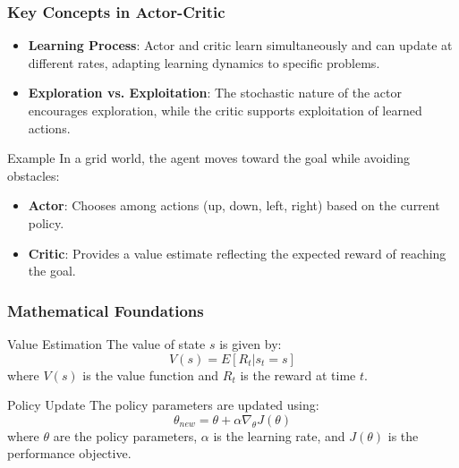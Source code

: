 \documentclass[aspectratio=169]{beamer}
\begin{document}
\begin{frame}[fragile]
    \frametitle{Key Concepts in Actor-Critic}
    \begin{itemize}
        \item \textbf{Learning Process}: Actor and critic learn simultaneously and can update at different rates, adapting learning dynamics to specific problems.
        \item \textbf{Exploration vs. Exploitation}: The stochastic nature of the actor encourages exploration, while the critic supports exploitation of learned actions.
    \end{itemize}
    
    \begin{block}{Example}
        In a grid world, the agent moves toward the goal while avoiding obstacles:
        \begin{itemize}
            \item \textbf{Actor}: Chooses among actions (up, down, left, right) based on the current policy.
            \item \textbf{Critic}: Provides a value estimate reflecting the expected reward of reaching the goal.
        \end{itemize}
    \end{block}
\end{frame}

\begin{frame}[fragile]
    \frametitle{Mathematical Foundations}
    \begin{block}{Value Estimation}
        The value of state \(s\) is given by:
        \begin{equation}
            V(s) = E[R_t | s_t = s]
        \end{equation}
        where \(V(s)\) is the value function and \(R_t\) is the reward at time \(t\).
    \end{block}
    
    \begin{block}{Policy Update}
        The policy parameters are updated using:
        \begin{equation}
            \theta_{new} = \theta + \alpha \nabla_\theta J(\theta)
        \end{equation}
        where \(\theta\) are the policy parameters, \(\alpha\) is the learning rate, and \(J(\theta)\) is the performance objective.
    \end{block}
\end{frame}
\end{document}
